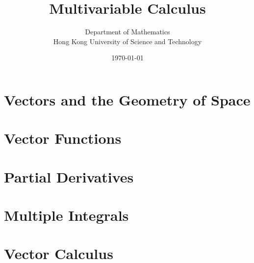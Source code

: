 \documentclass{book}
\begin{document}
\frontmatter
\title{\sffamily\Huge\color{ocre} Multivariable Calculus}
\author{\sffamily Department of Mathematics\\\sffamily Hong Kong University of Science and Technology}
\date{\sffamily \today}
\maketitle

\tableofcontents

\mainmatter

\chapter{Vectors and the Geometry of Space}

\chapter{Vector Functions}

\chapter{Partial Derivatives}

\chapter{Multiple Integrals}

\chapter{Vector Calculus}
\end{document}
